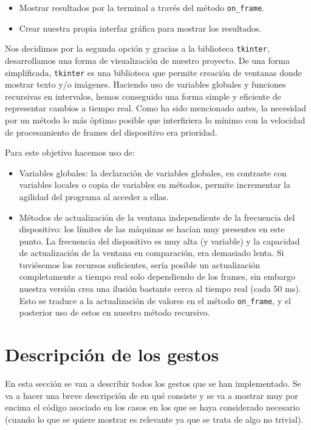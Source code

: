\documentclass[11pt,a4paper]{article}
\begin{document}
\begin{itemize}[label=\textbullet]
	\item Mostrar resultados por la terminal a través del método \texttt{on\_frame}.
	\item Crear nuestra propia interfaz gráfica para mostrar los resultados.
\end{itemize}

Nos decidimos por la segunda opción y gracias a la biblioteca \texttt{tkinter}, desarrollamos una forma de visualización de nuestro proyecto.
De una forma simplificada, \texttt{tkinter} es una biblioteca que permite creación de ventanas donde mostrar texto y/o imágenes. Haciendo uso de variables
globales y funciones recursivas en intervalos, hemos conseguido una forma simple y eficiente de representar cambios a tiempo real.
Como ha sido mencionado antes, la necesidad por un método lo más óptimo posible que interfiriera lo mínimo con la velocidad de procesamiento de frames del
dispositivo era prioridad. 

Para este objetivo hacemos uso de:

\begin{itemize}[label=\textbullet]
	\item Variables globales: la declaración de variables globales, en contraste con variables locales o copia de variables en métodos, permite incrementar
	la agilidad del programa al acceder a ellas.
	\item Métodos de actualización de la ventana independiente de la frecuencia del dispositivo: los límites de las máquinas se hacían muy presentes en este
	punto. La frecuencia del dispositivo es muy alta (y variable) y la capacidad de actualización de la ventana en comparación, era demasiado lenta. Si tuviésemos
	los recursos suficientes, sería posible un actualización completamente a tiempo real solo dependiendo de los frames, sin embargo nuestra versión crea una
	ilusión bastante cerca al tiempo real (cada 50 ms). Esto se traduce a la actualización de valores en el método \texttt{on\_frame}, y el posterior uso de
	estos en nuestro método recursivo.
\end{itemize}

\section{Descripción de los gestos}

En esta sección se van a describir todos los gestos que se han implementado. Se va a hacer una breve descripción de en qué consiste y se va a mostrar muy por
encima el código asociado en los casos en los que se haya considerado necesario (cuando lo que se quiere mostrar es relevante ya que se trata de algo no trivial).
\end{document}
